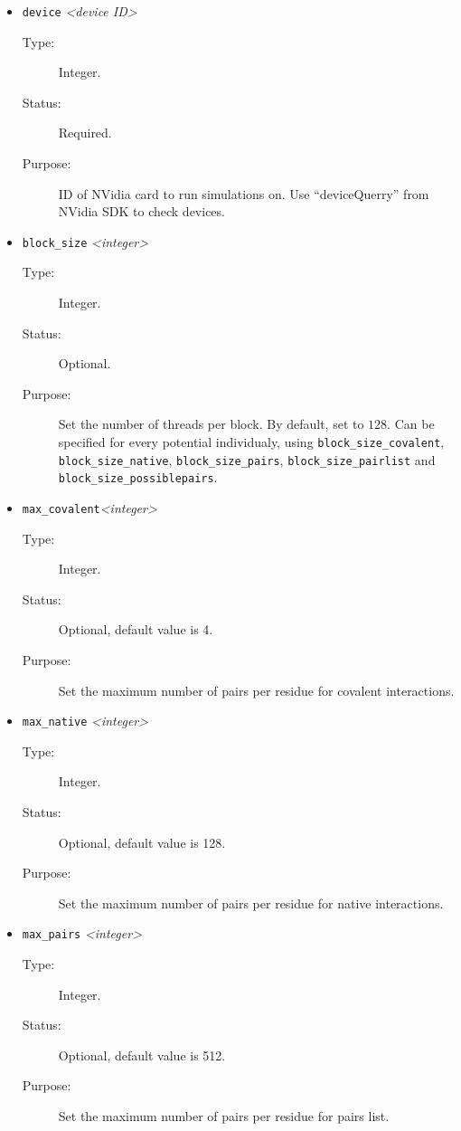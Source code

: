 \documentclass[a4paper]{article}
\begin{document}
\begin{itemize}

\item \texttt{device} \textit{\textless device ID\textgreater}
\begin{description}
\item[Type:] Integer.
\item[Status:] Required.
\item[Purpose:] ID of NVidia card to run simulations on. Use ``deviceQuerry'' from NVidia SDK to check devices.
\end{description}

\item \texttt{block\_size} \textit{\textless integer\textgreater}
\begin{description}
\item[Type:] Integer.
\item[Status:] Optional.
\item[Purpose:] Set the number of threads per block. By default, set to $128$. Can be specified for every potential individualy, using \texttt{block\_size\_covalent}, \texttt{block\_size\_native}, \texttt{block\_size\_pairs}, \texttt{block\_size\_pairlist} and \texttt{block\_size\_possiblepairs}.
\end{description}


\item \texttt{max\_covalent}\textit{\textless integer\textgreater}
\begin{description}
\item[Type:] Integer.
\item[Status:] Optional, default value is 4.
\item[Purpose:] Set the maximum number of pairs per residue for covalent interactions.
\end{description}

\item \texttt{max\_native} \textit{\textless integer\textgreater}
\begin{description}
\item[Type:] Integer.
\item[Status:] Optional, default value is 128.
\item[Purpose:] Set the maximum number of pairs per residue for native interactions.
\end{description}

\item \texttt{max\_pairs} \textit{\textless integer\textgreater}
\begin{description}
\item[Type:] Integer.
\item[Status:] Optional, default value is 512.
\item[Purpose:] Set the maximum number of pairs per residue for pairs list.
\end{description}


\end{itemize}
\end{document}
